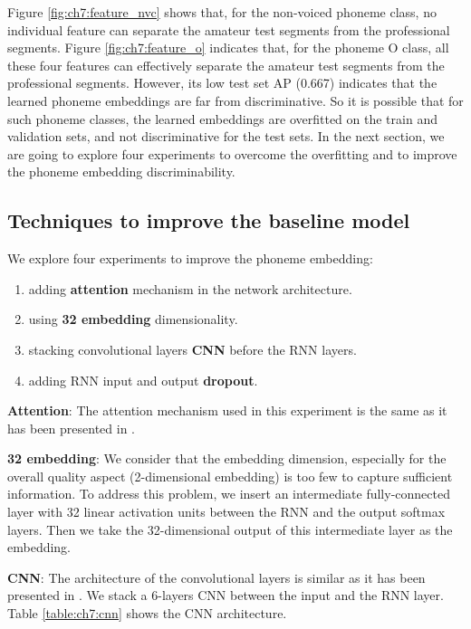 Figure \ref{fig:ch7:feature_nvc} shows that, for the non-voiced phoneme class, no individual feature can separate the amateur test segments from the professional segments. Figure \ref{fig:ch7:feature_o} indicates that, for the phoneme O class, all these four features can effectively separate the amateur test segments from the professional segments. However, its low test set \gls{AP} (0.667) indicates that the learned phoneme embeddings are far from discriminative. So it is possible that for such phoneme classes, the learned embeddings are overfitted on the train and validation sets, and not discriminative for the test sets. In the next section, we are going to explore four experiments to overcome the overfitting and to improve the phoneme embedding discriminability.

\subsection{Techniques to improve the baseline model}

We explore four experiments to improve the phoneme embedding:

\begin{enumerate}[itemsep=0pt]
\item adding \textbf{attention} mechanism in the network architecture.
\item using \textbf{32 embedding} dimensionality.
\item stacking convolutional layers \textbf{\gls{CNN}} before the \gls{RNN} layers.
\item adding \gls{RNN} input and output \textbf{dropout}.
\end{enumerate}

\textbf{Attention}: The attention mechanism used in this experiment is the same as it has been presented in .

\textbf{32 embedding}: We consider that the embedding dimension, especially for the overall quality aspect (2-dimensional embedding) is too few to capture sufficient information. To address this problem, we insert an intermediate fully-connected layer with 32 linear activation units between the \gls{RNN} and the output softmax layers. Then we take the 32-dimensional output of this intermediate layer as the embedding.

\textbf{\gls{CNN}}: The architecture of the convolutional layers is similar as it has been presented in . We stack a 6-layers \gls{CNN} between the input and the \gls{RNN} layer. Table \ref{table:ch7:cnn} shows the \gls{CNN} architecture. 

